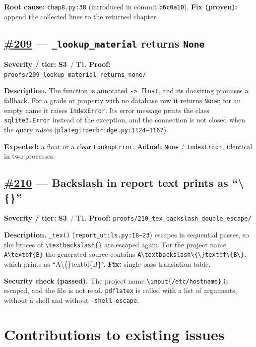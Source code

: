 \documentclass[11pt,a4paper]{article}
\newcommand{\issue}[1]{\href{https://github.com/Nidhikhare12/OsdagBridge/issues/#1}{\##1}}
\newcommand{\proof}[1]{\texttt{proofs/#1}}
\newcommand{\sevL}{\textcolor{sevlow}{\textbf{S3}}}
\begin{document}
\textbf{Root cause:} \texttt{chap8.py:38} (introduced in commit \texttt{b6c0a10}). \quad \textbf{Fix (proven):} append the collected lines to the returned chapter.

\subsection{\issue{209} --- \texttt{\_lookup\_material} returns \texttt{None}}
\textbf{Severity / tier:} \sevL\ / T1. \quad \textbf{Proof:} \proof{209\_lookup\_material\_returns\_none/}

\textbf{Description.} The function is annotated \texttt{-> float}, and its docstring promises a fallback. For a grade or property with no database row it returns \texttt{None}; for an empty name it raises \texttt{IndexError}. Its error message prints the class \texttt{sqlite3.Error} instead of the exception, and the connection is not closed when the query raises (\texttt{plategirderbridge.py:1124--1167}).

\textbf{Expected:} a float or a clear \texttt{LookupError}. \quad \textbf{Actual:} \texttt{None} / \texttt{IndexError}, identical in two processes.

\subsection{\issue{210} --- Backslash in report text prints as ``\textbackslash\{\}''}
\textbf{Severity / tier:} \sevL\ / T1. \quad \textbf{Proof:} \proof{210\_tex\_backslash\_double\_escape/}

\textbf{Description.} \texttt{\_tex()} (\texttt{report\_utils.py:18--23}) escapes in sequential passes, so the braces of \texttt{\textbackslash textbackslash\{\}} are escaped again. For the project name \verb|A\textbf{B}| the generated source contains \verb|A\textbackslash\{\}textbf\{B\}|, which prints as ``A\textbackslash\{\}textbf\{B\}''. \textbf{Fix:} single-pass translation table.

\textbf{Security check (passed).} The project name \texttt{\textbackslash input\{/etc/hostname\}} is escaped, and the file is not read. \texttt{pdflatex} is called with a list of arguments, without a shell and without \texttt{-shell-escape}.

\section{Contributions to existing issues}\label{sec:contrib}
\end{document}
